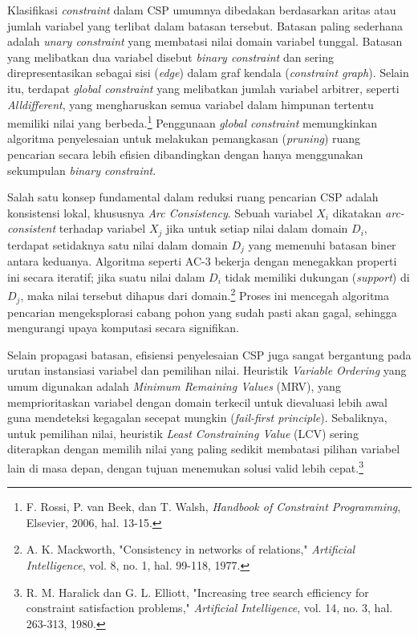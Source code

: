 \documentclass[a4paper,twoside]{article}
\begin{document}
	Klasifikasi \textit{constraint} dalam CSP umumnya dibedakan berdasarkan aritas atau jumlah variabel yang terlibat dalam batasan tersebut. Batasan paling sederhana adalah \textit{unary constraint} yang membatasi nilai domain variabel tunggal. Batasan yang melibatkan dua variabel disebut \textit{binary constraint} dan sering direpresentasikan sebagai sisi (\textit{edge}) dalam graf kendala (\textit{constraint graph}). Selain itu, terdapat \textit{global constraint} yang melibatkan jumlah variabel arbitrer, seperti \textit{Alldifferent}, yang mengharuskan semua variabel dalam himpunan tertentu memiliki nilai yang berbeda.\footnote{F. Rossi, P. van Beek, dan T. Walsh, \textit{Handbook of Constraint Programming}, Elsevier, 2006, hal. 13-15.} Penggunaan \textit{global constraint} memungkinkan algoritma penyelesaian untuk melakukan pemangkasan (\textit{pruning}) ruang pencarian secara lebih efisien dibandingkan dengan hanya menggunakan sekumpulan \textit{binary constraint}.
	
	Salah satu konsep fundamental dalam reduksi ruang pencarian CSP adalah konsistensi lokal, khususnya \textit{Arc Consistency}. Sebuah variabel $X_i$ dikatakan \textit{arc-consistent} terhadap variabel $X_j$ jika untuk setiap nilai dalam domain $D_i$, terdapat setidaknya satu nilai dalam domain $D_j$ yang memenuhi batasan biner antara keduanya. Algoritma seperti AC-3 bekerja dengan menegakkan properti ini secara iteratif; jika suatu nilai dalam $D_i$ tidak memiliki dukungan (\textit{support}) di $D_j$, maka nilai tersebut dihapus dari domain.\footnote{A. K. Mackworth, "Consistency in networks of relations," \textit{Artificial Intelligence}, vol. 8, no. 1, hal. 99-118, 1977.} Proses ini mencegah algoritma pencarian mengeksplorasi cabang pohon yang sudah pasti akan gagal, sehingga mengurangi upaya komputasi secara signifikan.
	
	Selain propagasi batasan, efisiensi penyelesaian CSP juga sangat bergantung pada urutan instansiasi variabel dan pemilihan nilai. Heuristik \textit{Variable Ordering} yang umum digunakan adalah \textit{Minimum Remaining Values} (MRV), yang memprioritaskan variabel dengan domain terkecil untuk dievaluasi lebih awal guna mendeteksi kegagalan secepat mungkin (\textit{fail-first principle}). Sebaliknya, untuk pemilihan nilai, heuristik \textit{Least Constraining Value} (LCV) sering diterapkan dengan memilih nilai yang paling sedikit membatasi pilihan variabel lain di masa depan, dengan tujuan menemukan solusi valid lebih cepat.\footnote{R. M. Haralick dan G. L. Elliott, "Increasing tree search efficiency for constraint satisfaction problems," \textit{Artificial Intelligence}, vol. 14, no. 3, hal. 263-313, 1980.}
	
\end{document}
